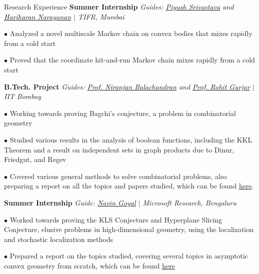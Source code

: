 
\begin{rubric}{Research Experience}
    \entry*[2022] \textbf{Summer Internship} \hfill \emph{Guides: \href{https://www.tifr.res.in/~piyush.srivastava/}{Piyush Srivastava} and \href{https://www.tifr.res.in/~hariharan.narayanan/}{Hariharan Narayanan} $\mid$ TIFR, Mumbai}

        $\bullet$ Analyzed a novel multiscale Markov chain on convex bodies that mixes rapidly from a cold start

        $\bullet$ Proved that the coordinate hit-and-run Markov chain mixes rapidly from a cold start


    \entry*[\phantom{.}2022] \textbf{B.Tech. Project} \hfill \emph{Guides: \href{https://homepages.iitb.ac.in/~niranj/}{Prof. Niranjan Balachandran} and \href{https://www.cse.iitb.ac.in/~rgurjar/}{Prof. Rohit Gurjar} $\mid$ IIT Bombay}

        $\bullet$ Working towards proving Bagchi's conjecture, a problem in combinatorial geometry

        $\bullet$ Studied various results in the analysis of boolean functions, including the KKL Theorem and a result on independent sets in graph products due to Dinur, Friedgut, and Regev

        $\bullet$ Covered various general methods to solve combinatorial problems, also preparing a report on all the topics and papers studied, which can be found \href{https://amitrajaraman.github.io/research/pls/btp1-report.pdf}{here}.
    
    \entry*[2021] \textbf{Summer Internship} \hfill \emph{Guide: \href{https://www.microsoft.com/en-us/research/people/navingo/}{Navin Goyal} $\mid$ Microsoft Research, Bengaluru}
        
        $\bullet$ Worked towards proving the KLS Conjecture and Hyperplane Slicing Conjecture, elusive problems in high-dimensional geometry, using the localization and stochastic localization methods

        $\bullet$ Prepared a report on the topics studied, covering several topics in asymptotic convex geometry from scratch, which can be found \href{https://amitrajaraman.github.io/notes/convex-geometry/main.pdf}{here}

\end{rubric}